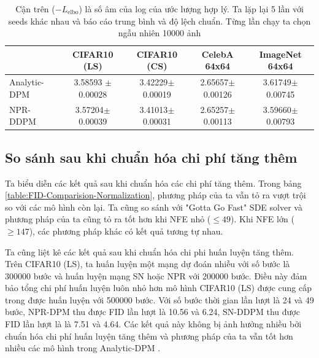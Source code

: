 \documentclass[14pt, a4paper]{article}
\numberwithin{equation}{section}
\numberwithin{figure}{section}
\numberwithin{dl}{section}
\numberwithin{md}{section}
\numberwithin{bd}{section}
\numberwithin{dn}{section}
\numberwithin{hq}{section}
\begin{document}
    \begin{table}
        \caption{Cận trên ($-L_{\mathrm{elbo}}$) là số âm của log của ước lượng hợp lý.
        Ta lặp lại 5 lần với seeds khác nhau và báo cáo trung bình và độ lệch chuẩn.
        Từng lần chạy ta chọn ngẫu nhiên 10000 ảnh}
        \begin{center}
            \begin{tabular}{lcccc}
                \hline
                & CIFAR10 (LS) & CIFAR10 (CS) & CelebA 64x64 & ImageNet 64x64 \\
                \hline
                Analytic-DPM \cite{bao2021analytic} & 3.58593 $\pm$ 0.00028 & 3.42229$\pm$0.00019 & 2.65657$\pm$0.00126 & 3.61749$\pm$0.00745 \\
                NPR-DDPM & 3.57204$\pm$0.00039 & 3.41013$\pm$0.00031 & 2.65257$\pm$0.00113 & 3.59660$\pm$0.00793 \\
                \hline
            \end{tabular}
        \end{center}
        \label{table:Likelihood-Variance}
    \end{table}

    \subsection{So sánh sau khi chuẩn hóa chi phí tăng thêm}
    
    Ta biểu diễn các kết quả sau khi chuẩn hóa các chi phí tăng thêm. Trong bảng \ref{table:FID-Comparision-Normalization}, phương pháp của ta vẫn tỏ ra vượt trội so với các mô hình còn lại.
    Ta cũng so sánh với "Gotta Go Fast" SDE solver \cite{jolicoeur2021gotta} và phương pháp của ta cũng tỏ ra tốt hơn khi NFE nhỏ ($\leq 49$).
    Khi NFE lớn ($\geq 147$), các phương pháp khác có kết quả tương tự nhau.

    Ta cũng liệt kê các kết quả sau khi chuẩn hóa chi phi huấn luyện tăng thêm.
    Trên CIFAR10 (LS), ta huấn luyện một mạng dự đoán nhiễu với số bước là 300000 bước và huấn luyện mạng SN hoặc NPR với 200000 bước.
    Điều này đảm bảo tổng chi phí huấn luyện luôn nhỏ hơn mô hình CIFAR10 (LS) được cung cấp trong \cite{bao2021analytic} được huấn luyện với 500000 bước.
    Với số bước thời gian lần lượt là 24 và 49 bước, NPR-DPM thu được FID lần lượt là 10.56 và 6.24, SN-DDPM thu được FID lần lượt là là 7.51 và 4.64.
    Các kết quả này không bị ảnh hưởng nhiều bởi chuẩn hóa chi phí huấn luyện tăng thêm và phương pháp của ta vẫn tốt hơn nhiều các mô hình trong Analytic-DPM \cite{bao2021analytic}.
\end{document}

